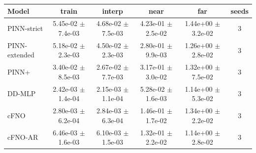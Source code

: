 \begin{tabular}{lccccc}
\toprule
Model & train & interp & near & far & seeds \\
\midrule
PINN-strict & 5.45e-02 $\pm$ 7.4e-03 & 4.68e-02 $\pm$ 7.5e-03 & 4.23e-01 $\pm$ 2.5e-02 & 1.44e+00 $\pm$ 3.2e-02 & 3 \\
PINN-extended & 5.18e-02 $\pm$ 2.3e-03 & 4.50e-02 $\pm$ 2.3e-03 & 2.80e-01 $\pm$ 9.9e-03 & 1.26e+00 $\pm$ 2.8e-02 & 3 \\
PINN+ & 3.40e-02 $\pm$ 8.5e-03 & 2.67e-02 $\pm$ 7.7e-03 & 3.17e-01 $\pm$ 3.0e-02 & 1.32e+00 $\pm$ 7.5e-02 & 3 \\
DD-MLP & 2.42e-03 $\pm$ 1.4e-04 & 2.15e-03 $\pm$ 1.1e-04 & 5.28e-02 $\pm$ 1.6e-03 & 1.14e+00 $\pm$ 5.3e-02 & 3 \\
cFNO & 2.80e-03 $\pm$ 6.2e-04 & 2.84e-03 $\pm$ 6.3e-04 & 1.46e-01 $\pm$ 1.7e-02 & 1.34e+00 $\pm$ 2.2e-02 & 3 \\
cFNO-AR & 6.46e-03 $\pm$ 1.6e-03 & 6.10e-03 $\pm$ 1.5e-03 & 1.32e-01 $\pm$ 2.2e-02 & 1.14e+00 $\pm$ 2.8e-02 & 3 \\
\bottomrule
\end{tabular}

